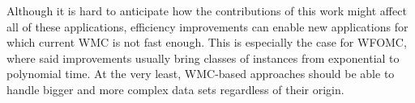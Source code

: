 Although it is hard to anticipate how the contributions of this work might
affect all of these applications, efficiency improvements can enable new
applications for which current WMC is not fast enough. This is especially the
case for WFOMC, where said improvements usually bring classes of instances from
exponential to polynomial time. At the very least, WMC-based approaches should
be able to handle bigger and more complex data sets regardless of their origin.
